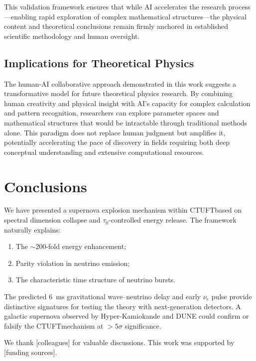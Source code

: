 \documentclass[twocolumn, tightenlines, showpacs, showkeys, nofootinbib]{revtex4-1}
\newcommand{\ctuft}{\textsc{CTUFT}}
\newcommand{\tauzero}{\tau_0}
\begin{document}
This validation framework ensures that while AI accelerates the research 
process---enabling rapid exploration of complex mathematical structures---the 
physical content and theoretical conclusions remain firmly anchored in 
established scientific methodology and human oversight.

\subsection{Implications for Theoretical Physics}

The human-AI collaborative approach demonstrated in this work suggests 
a transformative model for future theoretical physics research. By 
combining human creativity and physical insight with AI's capacity for 
complex calculation and pattern recognition, researchers can explore 
parameter spaces and mathematical structures that would be intractable 
through traditional methods alone. This paradigm does not replace human 
judgment but amplifies it, potentially accelerating the pace of discovery 
in fields requiring both deep conceptual understanding and extensive 
computational resources.

\section{Conclusions}
\label{sec:conclusions}

We have presented a supernova explosion mechanism within \ctuft based on 
spectral dimension collapse and $\tauzero$-controlled energy release. The 
framework naturally explains:
\begin{enumerate}
    \item The $\sim$200-fold energy enhancement;
    \item Parity violation in neutrino emission;
    \item The characteristic time structure of neutrino bursts.
\end{enumerate}

The predicted 6~ms gravitational wave--neutrino delay and early $\nu_e$ pulse 
provide distinctive signatures for testing the theory with next-generation 
detectors. A galactic supernova observed by Hyper-Kamiokande and DUNE could 
confirm or falsify the \ctuft mechanism at $>5\sigma$ significance.

\begin{acknowledgments}
We thank [colleagues] for valuable discussions. This work was supported by 
[funding sources].
\end{acknowledgments}
\end{document}
